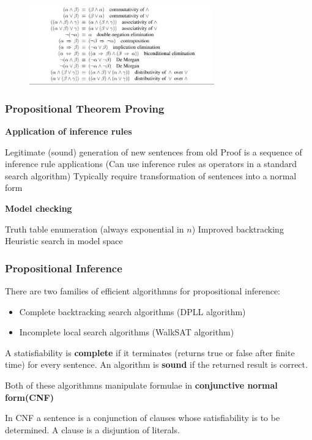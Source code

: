 \documentclass{article}
\begin{document}
\begin{figure}[ht]
\includegraphics[width=8cm]{Standard Logical Equivalences.png}
\centering
\end{figure}

\subsubsection{Propositional Theorem Proving}

\textbf{Application of inference rules}

Legitimate (sound) generation of new sentences from old
Proof is a sequence of inference rule applications (Can use inference rules as operators in a standard search algorithm)
Typically require transformation of sentences into a normal form

\textbf{Model checking}

Truth table enumeration (always exponential in $n$)
Improved backtracking
Heuristic search in model space


\subsubsection{Propositional Inference}

There are two families of efficient algorithmns for propositional inference:
\begin{itemize}
    \item Complete backtracking search algorithms (DPLL algorithm)
    \item Incomplete local search algorithms (WalkSAT algorithm)
\end{itemize}

A statisfiability is \textbf{complete} if it terminates (returns true or false after finite time) for every sentence. An algorithm is \textbf{sound} if the returned result is correct.

Both of these algorithmns manipulate formulae in \textbf{conjunctive normal form(CNF)}

In CNF a sentence is a conjunction of clauses whose satisfiability is to be determined. A clause is a disjuntion of literals.  \newline
\end{document}
